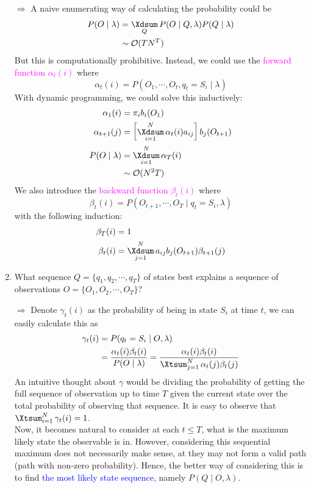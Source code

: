 \documentclass[UTF8]{book}
\DeclareMathOperator*{\Xsum}{\mathchoice{\Xdsum}{\Xtsum}{\Xtsum}{\Xtsum}}
\newcommand{\et}{&}
\newcommand{\f}{^2}
\newcommand{\concept}[1]{\textcolor{magenta}{#1}}
\renewcommand{\emph}[1]{\textcolor{blue}{#1}}
\begin{document}
\begin{itemize}
\begin{itemize}
\begin{enumerate}
		\item[$\Rightarrow$] A naive enumerating way of calculating the probability could be
		\begin{align*}
			P(O\mid\lambda) \et = \Xsum_{Q}P(O\mid Q,\lambda)P(Q\mid\lambda)\\
			\et \sim \mathcal{O}(TN^T)
		\end{align*}
		But this is computationally prohibitive. Instead, we could use the \concept{forward function $\alpha_t(i)$} where
		$$
		\alpha_t(i) = P(O_1,\cdots,O_t,q_t=S_i\mid\lambda)		
		$$
		With dynamic programming, we could solve this inductively:
		\begin{align*}
			\alpha_1(i) \et = \pi_i b_i (O_1)\\
			\alpha_{t+1}(j) \et = \left[\Xsum_{i=1}^N\alpha_t(i)a_{ij}\right]b_j(O_{t+1})\\
			P(O\mid\lambda) \et = \Xsum_{i=1}^N\alpha_T(i)\\
			\et \sim \mathcal{O}(N\f T)
		\end{align*}
		We also introduce the \concept{backward function $\beta_t(i)$} where
		$$
					\beta_t(i) = P(O_{t+1},\cdots,O_T\mid q_t=S_i,\lambda)		
		$$
		with the following induction:
		\begin{align*}
			\beta_T(i) \et = 1\\
			\beta_t(i) \et = \Xsum_{j=1}^N a_{ij}b_j(O_{t+1})\beta_{t+1}(j)
		\end{align*}
		\item What sequence $Q = \{q_1,q_2,\cdots,q_T\}$ of states best explains a sequence of observations $O = \{O_1,O_2,\cdots,O_T\}$?
		\item[$\Rightarrow$] Denote $\gamma_t(i)$ as the probability of being in state $S_i$ at time $t$, we can easily calculate this as
		\begin{align*}
			\gamma_t(i) \et = P(q_t = S_i\mid O,\lambda)	\\
			\et = \dfrac{\alpha_t(i)\beta_t(i)}{P(O\mid\lambda)} = \dfrac{\alpha_t(i)\beta_t(i)}{\Xsum_{j=1}^N\alpha_t(j)\beta_t(j)}
		\end{align*}
		An intuitive thought about $\gamma$ would be dividing the probability of getting the full sequence of observation up to time $T$ given the current state over the total probability of observing that sequence. It is easy to observe that $\Xsum_{i=1}^N\gamma_t(i) = 1$.\\
		Now, it becomes natural to consider at each $t\leq T$, what is the maximum likely state the observable is in. However, considering this sequential maximum does not necessarily make sense, at they may not form a valid path (path with non-zero probability). Hence, the better way of considering this is to find \emph{the most likely state sequence}, namely $P(Q\mid O,\lambda)$.\\

\end{enumerate}
\end{itemize}
\end{itemize}
\end{document}
